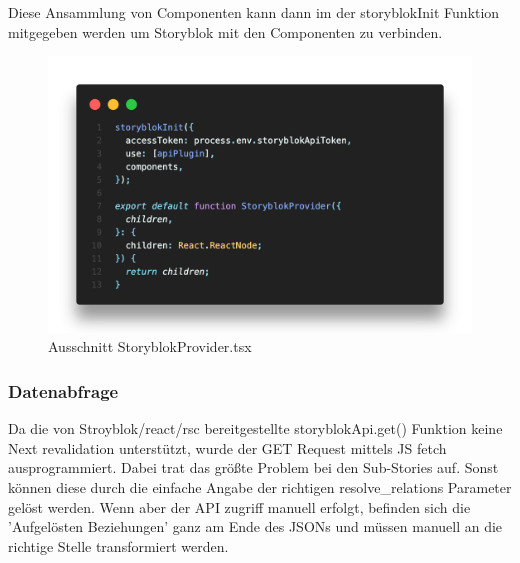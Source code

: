 Diese Ansammlung von Componenten kann dann im der storyblokInit Funktion mitgegeben werden um Storyblok mit den Componenten zu verbinden. 

\begin{figure}[H]
    \centering
    \includegraphics[width=\linewidth]{pics/sb-provider-03.png}
    \caption{Ausschnitt StoryblokProvider.tsx}
\end{figure}

\subsubsection*{Datenabfrage}
Da die von Stroyblok/react/rsc bereitgestellte storyblokApi.get() Funktion keine Next revalidation unterstützt, wurde der GET Request mittels JS fetch ausprogrammiert. 
Dabei trat das größte Problem bei den Sub-Stories auf. 
Sonst können diese durch die einfache Angabe der richtigen resolve\_relations Parameter gelöst werden. 
Wenn aber der API zugriff manuell erfolgt, befinden sich die 'Aufgelösten Beziehungen' ganz am Ende des JSONs und müssen manuell an die richtige Stelle transformiert werden. 

